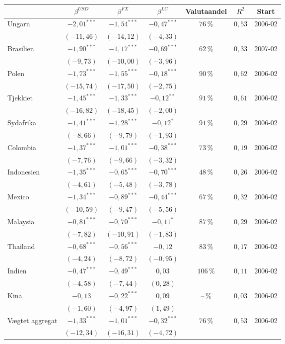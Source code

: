 \begin{tabular}{lcccccc}
\toprule
 & $\beta^{USD}$ & $\beta^{FX}$ & $\beta^{LC}$ & Valutaandel & $R^2$ & Start \\
\midrule
Ungarn & $-2{,}01^{***}$ & $-1{,}54^{***}$ & $-0{,}47^{***}$ & $76$\,\% & $0{,}53$ & 2006-02 \\
 & $(-11{,}46)$ & $(-14{,}12)$ & $(-4{,}33)$ & & & \\
Brasilien & $-1{,}90^{***}$ & $-1{,}17^{***}$ & $-0{,}69^{***}$ & $62$\,\% & $0{,}33$ & 2007-02 \\
 & $(-9{,}73)$ & $(-10{,}00)$ & $(-3{,}96)$ & & & \\
Polen & $-1{,}73^{***}$ & $-1{,}55^{***}$ & $-0{,}18^{***}$ & $90$\,\% & $0{,}62$ & 2006-02 \\
 & $(-15{,}74)$ & $(-17{,}50)$ & $(-2{,}75)$ & & & \\
Tjekkiet & $-1{,}45^{***}$ & $-1{,}33^{***}$ & $-0{,}12^{**}$ & $91$\,\% & $0{,}61$ & 2006-02 \\
 & $(-16{,}82)$ & $(-18{,}45)$ & $(-2{,}00)$ & & & \\
Sydafrika & $-1{,}41^{***}$ & $-1{,}28^{***}$ & $-0{,}12^{*}$ & $91$\,\% & $0{,}29$ & 2006-02 \\
 & $(-8{,}66)$ & $(-9{,}79)$ & $(-1{,}93)$ & & & \\
Colombia & $-1{,}37^{***}$ & $-1{,}01^{***}$ & $-0{,}38^{***}$ & $73$\,\% & $0{,}19$ & 2006-02 \\
 & $(-7{,}76)$ & $(-9{,}66)$ & $(-3{,}32)$ & & & \\
Indonesien & $-1{,}35^{***}$ & $-0{,}65^{***}$ & $-0{,}70^{***}$ & $48$\,\% & $0{,}26$ & 2006-02 \\
 & $(-4{,}61)$ & $(-5{,}48)$ & $(-3{,}78)$ & & & \\
Mexico & $-1{,}34^{***}$ & $-0{,}89^{***}$ & $-0{,}44^{***}$ & $67$\,\% & $0{,}32$ & 2006-02 \\
 & $(-10{,}59)$ & $(-9{,}47)$ & $(-5{,}56)$ & & & \\
Malaysia & $-0{,}81^{***}$ & $-0{,}70^{***}$ & $-0{,}11^{*}$ & $87$\,\% & $0{,}29$ & 2006-02 \\
 & $(-7{,}82)$ & $(-10{,}91)$ & $(-1{,}83)$ & & & \\
Thailand & $-0{,}68^{***}$ & $-0{,}56^{***}$ & $-0{,}12$ & $83$\,\% & $0{,}17$ & 2006-02 \\
 & $(-4{,}24)$ & $(-8{,}72)$ & $(-0{,}95)$ & & & \\
Indien & $-0{,}47^{***}$ & $-0{,}49^{***}$ & $0{,}03$ & $106$\,\% & $0{,}11$ & 2006-02 \\
 & $(-4{,}58)$ & $(-7{,}44)$ & $(0{,}28)$ & & & \\
Kina & $-0{,}13$ & $-0{,}22^{***}$ & $0{,}09$ & --\,\% & $0{,}03$ & 2006-02 \\
 & $(-1{,}60)$ & $(-4{,}97)$ & $(1{,}49)$ & & & \\
\midrule
Vægtet aggregat & $-1{,}33^{***}$ & $-1{,}01^{***}$ & $-0{,}32^{***}$ & $76$\,\% & $0{,}53$ & 2006-02 \\
 & $(-12{,}34)$ & $(-16{,}31)$ & $(-4{,}72)$ & & & \\
\bottomrule
\end{tabular}
